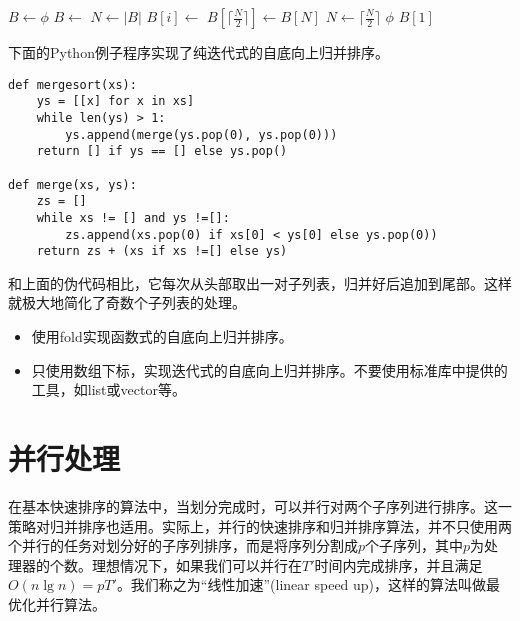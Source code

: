 \documentclass[UTF8]{article}
\begin{document}
\begin{algorithmic}[1]
  \State $B \gets \phi$
    \State $B \gets$ 
  \EndFor
  \State $N \gets |B|$
      \State $B[i] \gets$ 
    \EndFor
      \State $B[\lceil \frac{N}{2} \rceil] \gets B[N]$
    \EndIf
    \State $N \gets \lceil \frac{N}{2} \rceil$
  \EndWhile
    \State \Return $\phi$
  \EndIf
  \State \Return $B[1]$
\EndFunction
\end{algorithmic}

下面的Python例子程序实现了纯迭代式的自底向上归并排序。

\lstset{language=Python}
\begin{lstlisting}
def mergesort(xs):
    ys = [[x] for x in xs]
    while len(ys) > 1:
        ys.append(merge(ys.pop(0), ys.pop(0)))
    return [] if ys == [] else ys.pop()

def merge(xs, ys):
    zs = []
    while xs != [] and ys !=[]:
        zs.append(xs.pop(0) if xs[0] < ys[0] else ys.pop(0))
    return zs + (xs if xs !=[] else ys)
\end{lstlisting}

和上面的伪代码相比，它每次从头部取出一对子列表，归并好后追加到尾部。这样就极大地简化了奇数个子列表的处理。

\begin{Exercise}
\begin{itemize}
\item 使用fold实现函数式的自底向上归并排序。
\item 只使用数组下标，实现迭代式的自底向上归并排序。不要使用标准库中提供的工具，如list或vector等。
\end{itemize}
\end{Exercise}

\section{并行处理}

在基本快速排序的算法中，当划分完成时，可以并行对两个子序列进行排序。这一策略对归并排序也适用。实际上，并行的快速排序和归并排序算法，并不只使用两个并行的任务对划分好的子序列排序，而是将序列分割成$p$个子序列，其中$p$为处理器的个数。理想情况下，如果我们可以并行在$T'$时间内完成排序，并且满足$O(n \lg n) = p T'$。我们称之为“线性加速”(linear speed up)，这样的算法叫做最优化并行算法。
\end{document}
